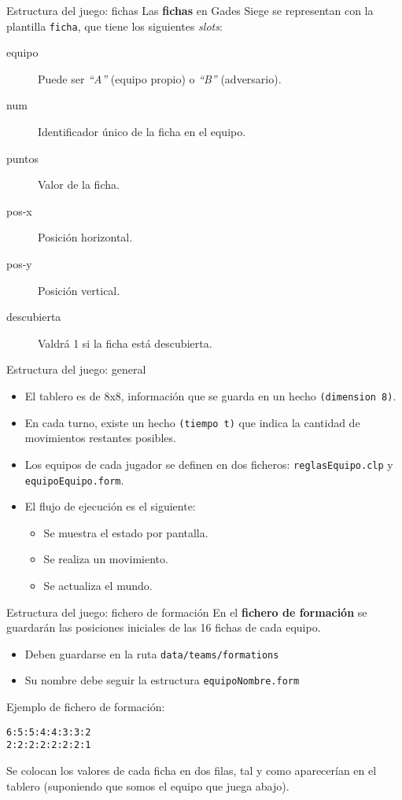 \documentclass[smaller,spanish,xcolor=svgnames]{beamer}
\begin{document}
\begin{frame}[fragile]{Estructura del juego: fichas}
  Las \textbf{fichas} en Gades Siege se representan con la plantilla \texttt{ficha}, que
  tiene los siguientes \textit{slots}:
  \begin{description}
  \item[equipo] Puede ser \textit{``A''} (equipo propio) o \textit{``B''} (adversario).
  \item[num] Identificador único de la ficha en el equipo.
  \item[puntos] Valor de la ficha.
  \item[pos-x] Posición horizontal.
  \item[pos-y] Posición vertical.
  \item[descubierta] Valdrá 1 si la ficha está descubierta.
  \end{description}  
\end{frame}


\begin{frame}{Estructura del juego: general}
  \begin{itemize}
  \item El tablero es de 8x8, información que se guarda en un hecho \texttt{(dimension 8)}.
  \item En cada turno, existe un hecho \texttt{(tiempo t)} que indica la
    cantidad de movimientos restantes posibles.
  \item Los equipos de cada jugador se definen en dos ficheros: \texttt{reglasEquipo.clp} y \texttt{equipoEquipo.form}.
  \item El flujo de ejecución es el siguiente:
    \begin{itemize}
    \item Se muestra el estado por pantalla.
    \item Se realiza un movimiento.
    \item Se actualiza el mundo.
    \end{itemize}
  \end{itemize}  
\end{frame}

\begin{frame}[fragile]{Estructura del juego: fichero de formación}
  En el \textbf{fichero de formación} se guardarán las posiciones iniciales de
  las 16 fichas de cada equipo.
  \begin{itemize}
  \item Deben guardarse en la ruta \texttt{data/teams/formations}
  \item Su nombre debe seguir la estructura \texttt{equipoNombre.form}
  \end{itemize}

  \medskip

  Ejemplo de fichero de formación:

\begin{verbatim}
6:5:5:4:4:3:3:2
2:2:2:2:2:2:2:1
\end{verbatim}

\medskip

Se colocan los valores de cada ficha en dos filas, tal y como aparecerían en el
tablero (suponiendo que somos el equipo que juega abajo).
\end{frame}
\end{document}

